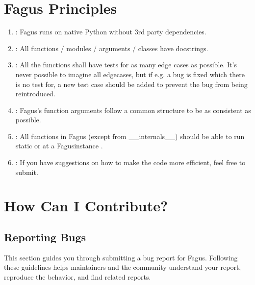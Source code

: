 \documentclass[a4paper,10pt,english]{sphinxmanual}
\begin{document}
\section{Fagus Principles}
\label{\detokenize{CONTRIBUTING:fagus-principles}}\begin{enumerate}
%
\item {}
\sphinxAtStartPar
{}: Fagus runs on native Python without 3rd party dependencies.

\item {}
\sphinxAtStartPar
{}: All functions / modules / arguments / classes have docstrings.

\item {}
\sphinxAtStartPar
{}: All the functions shall have tests for as many edge cases as possible. It’s never possible to imagine all edge\sphinxhyphen{}cases, but if e.g. a bug is fixed which there is no test for, a new test case should be added to prevent the bug from being reintroduced.

\item {}
\sphinxAtStartPar
{}: Fagus’s function arguments follow a common structure to be as consistent as possible.

\item {}
\sphinxAtStartPar
{}: All functions in Fagus (except from \_\_internals\_\_) should be able to run static  or at a Fagus\sphinxhyphen{}instance .

\item {}
\sphinxAtStartPar
{}: If you have suggestions on how to make the code more efficient, feel free to submit.

\end{enumerate}


\section{How Can I Contribute?}
\label{\detokenize{CONTRIBUTING:how-can-i-contribute}}

\subsection{Reporting Bugs}
\label{\detokenize{CONTRIBUTING:reporting-bugs}}
\sphinxAtStartPar
This section guides you through submitting a bug report for Fagus. Following these guidelines helps maintainers and the community understand your report, reproduce the behavior, and find related reports.
\end{document}
